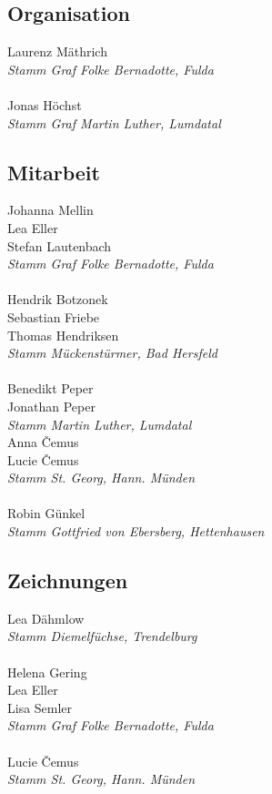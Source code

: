 \begin{centering}
\begin{multicols}{2}

\subsection*{Organisation}
Laurenz Mäthrich \\ \textit{Stamm Graf Folke Bernadotte, Fulda} \\ ~\\
Jonas Höchst \\ \textit{Stamm Graf Martin Luther, Lumdatal}

\subsection*{Mitarbeit}
Johanna Mellin \\ Lea Eller \\ Stefan Lautenbach \\ \textit{Stamm Graf Folke Bernadotte, Fulda} \\ ~\\
Hendrik Botzonek \\ Sebastian Friebe \\ Thomas Hendriksen \\ \textit{Stamm Mückenstürmer, Bad Hersfeld} \\ ~\\
Benedikt Peper \\ Jonathan Peper \\ \textit{Stamm Martin Luther, Lumdatal} \\ \columnbreak
Anna \v{C}emus \\ Lucie \v{C}emus \\ \textit{Stamm St. Georg, Hann. Münden} \\ ~\\
Robin Günkel \\ \textit{Stamm Gottfried von Ebersberg, Hettenhausen} \\

\subsection*{Zeichnungen}
Lea Dähmlow \\ \textit{Stamm Diemelfüchse, Trendelburg} \\ ~\\
Helena Gering \\ Lea Eller \\ Lisa Semler \\ \textit{Stamm Graf Folke Bernadotte, Fulda} \\ ~\\
Lucie \v{C}emus \\ \textit{Stamm St. Georg, Hann. Münden} \\


\end{multicols}
\end{centering}
